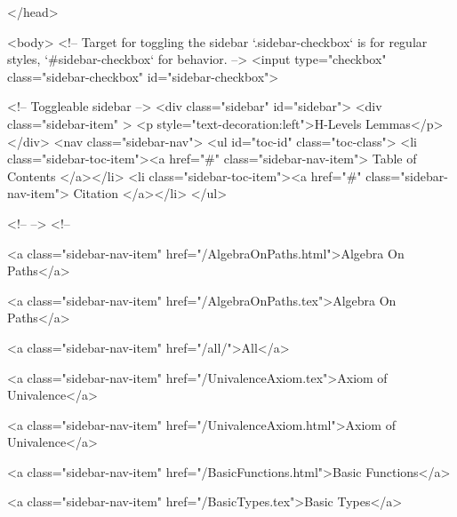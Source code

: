   
</head>




  <body>
    <!-- Target for toggling the sidebar `.sidebar-checkbox` is for regular
     styles, `#sidebar-checkbox` for behavior. -->
<input type="checkbox" class="sidebar-checkbox" id="sidebar-checkbox">

<!-- Toggleable sidebar -->
<div class="sidebar" id="sidebar">
  <div class="sidebar-item" >
    <p style="text-decoration:left">H-Levels Lemmas</p>
  </div>
  <nav class="sidebar-nav">
    <ul id="toc-id" class="toc-class">
  <li class="sidebar-toc-item"><a href="#" class="sidebar-nav-item"> Table of Contents </a></li>
  <li class="sidebar-toc-item"><a href="#" class="sidebar-nav-item"> Citation </a></li>
</ul>


    <!--  -->
    <!-- 
      
    
      
    
      
    
      
        
      
    
      
        
          <a class="sidebar-nav-item" href="/AlgebraOnPaths.html">Algebra On Paths</a>
        
      
    
      
        
          <a class="sidebar-nav-item" href="/AlgebraOnPaths.tex">Algebra On Paths</a>
        
      
    
      
        
          <a class="sidebar-nav-item" href="/all/">All</a>
        
      
    
      
        
          <a class="sidebar-nav-item" href="/UnivalenceAxiom.tex">Axiom of Univalence</a>
        
      
    
      
        
          <a class="sidebar-nav-item" href="/UnivalenceAxiom.html">Axiom of Univalence</a>
        
      
    
      
        
          <a class="sidebar-nav-item" href="/BasicFunctions.html">Basic Functions</a>
        
      
    
      
        
          <a class="sidebar-nav-item" href="/BasicTypes.tex">Basic Types</a>
        
